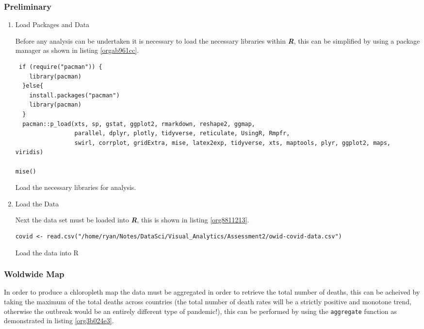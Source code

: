\documentclass[11pt]{article}
\begin{document}
\subsubsection{Preliminary}
\label{sec:org75a46a7}
\begin{enumerate}
\item Load Packages and Data
\label{sec:org764754a}

Before any analysis can be undertaken it is necessary to load the necessary libraries within \textbf{\emph{R}}, this can be simplified by using a package manager as shown in listing \ref{orgab961cc}.

\begin{listing}[htbp]
\begin{verbatim}
 if (require("pacman")) {
    library(pacman)
  }else{
    install.packages("pacman")
    library(pacman)
  }
  pacman::p_load(xts, sp, gstat, ggplot2, rmarkdown, reshape2, ggmap,
                 parallel, dplyr, plotly, tidyverse, reticulate, UsingR, Rmpfr,
                 swirl, corrplot, gridExtra, mise, latex2exp, tidyverse, xts, maptools, plyr, ggplot2, maps, viridis)

mise()

\end{verbatim}
\caption{\label{orgab961cc}Load the necessary libraries for analysis.}
\end{listing}

\item Load the Data
\label{sec:orgf5cb293}

Next the data set must be loaded into \textbf{\emph{R}}, this is shown in listing \ref{org8811213}.

\begin{listing}[htbp]
\begin{verbatim}
covid <- read.csv("/home/ryan/Notes/DataSci/Visual_Analytics/Assessment2/owid-covid-data.csv")

\end{verbatim}
\caption{\label{org8811213}Load the data into R}
\end{listing}
\end{enumerate}

\subsubsection{Woldwide Map}
\label{sec:org101f8fd}
In order to produce a chloropleth map the data must be aggregated in order to retrieve the total number of
deaths, this can be acheived by taking the maximum of the total deaths across
countries (the total number of death rates will be a strictly positive and
monotone trend, otherwise the outbreak would be an entirely different type of
pandemic!), this can be performed by using the \texttt{aggregate} function as
demonstrated in listing \ref{org3b024e3}.
\end{document}
